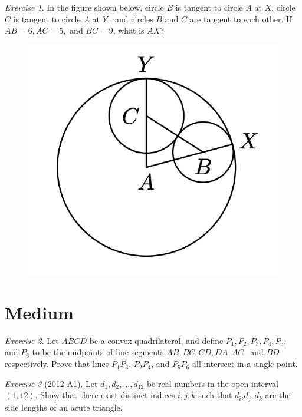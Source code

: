 \documentclass{article}
\theoremstyle{definition}
\theoremstyle{remark}
\newtheorem{exercise}{Exercise}
\begin{document}
\begin{exercise}
In the figure shown below, circle $B$ is tangent to circle $A$ at $X$, circle $C$ is tangent to circle $A$ at $Y$ , and circles $B$ and $C$ are tangent to each other. If $AB = 6, AC = 5,$ and $BC = 9$, what is $AX$?
\begin{figure}[hbt!]
\label{fig:aa}
\small
\centering
\includegraphics[scale = 0.4]{1.png}
\end{figure}
\end{exercise}

\section{Medium}

\begin{exercise}
Let $ABCD$ be a convex quadrilateral, and define $P_1, P_2, P_3, P_4, P_5,$ and $P_6$ to be the midpoints of line segments $AB, BC, CD, DA, AC,$ and $BD$ respectively. Prove that lines $P_{1}P_{3}$, $P_{2}P_{4}$, and $P_{5}P_{6}$ all intersect in a single point.
\end{exercise}

\begin{exercise}[2012 A1]
Let $d_{1}, d_{2}, \ldots, d_{12}$ be real numbers in the open interval $(1, 12)$. Show that there exist distinct indices $i, j, k$ such that $d_{i}$,$d_{j},d_{k}$ are the side lengths of an acute triangle.
\end{exercise}
\end{document}
